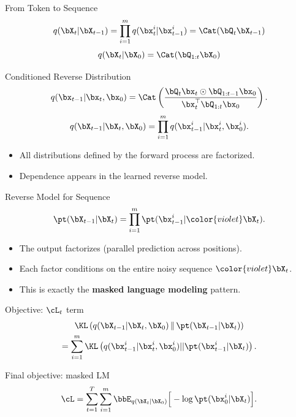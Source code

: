 \documentclass{beamer}
\begin{document}
\begin{frame}{From Token to Sequence}
    \[
        q(\bX_t |\bX_{t-1}) =
		\prod_{i=1}^m q(\bx_t^i |\bx_{t-1}^i) = \Cat(\bQ_t \bX_{t-1})
    \]
    \eqpause
    \[
        q(\bX_t |\bX_0) = \Cat(\bQ_{1:t} \bX_0)
    \]
    \vspace{-0.3cm}
    \eqpause
    \begin{block}{Conditioned Reverse Distribution}
        \[
            q(\bx_{t-1} | \bx_t, \bx_0)
			= \Cat\left(\frac{\bQ_t \bx_t \odot \bQ_{1:t-1} \bx_0}{\bx_t^{\top}\bQ_{1:t}\bx_0}\right).
        \]
        \vspace{-0.3cm}
        \[
            q(\bX_{t-1} | \bX_t, \bX_0) =
            \prod_{i=1}^m q(\bx_{t-1}^i |\bx_t^i, \bx_0^i).
        \]
        \vspace{-0.3cm}
    \end{block}
    \eqpause
    \begin{itemize}
        \item All distributions defined by the forward process are factorized.
        \item Dependence appears in the learned reverse model.
    \end{itemize}
\end{frame}
\begin{frame}{Reverse Model for Sequence}
    \[
        \pt(\bX_{t-1}|\bX_t) =
		\prod_{i=1}^m \pt(\bx_{t-1}^i | {\color{violet}\bX_t}).
    \]
    \vspace{-0.3cm}
    \begin{itemize}
        \item The output factorizes (parallel prediction across positions).
        \item Each factor conditions on the entire noisy sequence ${\color{violet}\bX_t}$.
        \item This is exactly the \textbf{masked language modeling} pattern.
    \end{itemize}
    \eqpause
    \begin{block}{Objective: $\cL_t$ term}
        \vspace{-0.7cm}
        \begin{multline*}
			\KL\left(q(\bX_{t-1}| \bX_t, \bX_0)\,\|\,\pt(\bX_{t-1}| \bX_t)\right) \\
			= \sum_{i=1}^m \KL\left(q(\bx_{t-1}^i|\bx_t^i, \bx_0^i) || \pt(\bx_{t-1}^i|\bX_t)\right).
        \end{multline*}
        \vspace{-0.5cm}
    \end{block}
    \eqpause
    \begin{block}{Final objective: masked LM}
        \vspace{-0.3cm}
        \[
            \cL =
            \sum_{t=1}^T \sum_{i=1}^m
            \bbE_{q(\bX_t|\bX_0)}
            \Big[-\log \pt(\bx_0^i |\bX_t)\Big].
        \]
    \end{block}
\end{frame}
\end{document}
